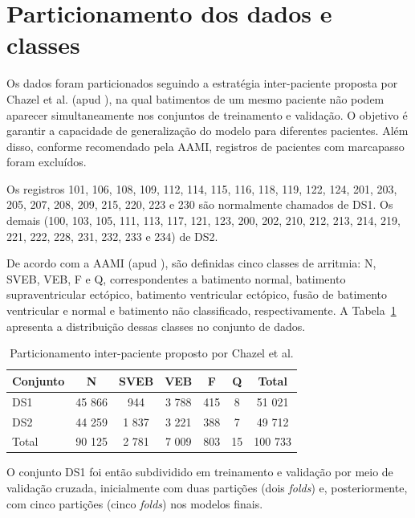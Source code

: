 \documentclass[
    12pt,                %
    openright,           %
    oneside,             %
    a4paper,             %
    brazil               %
]{abntex2}
\begin{document}
\section{Particionamento dos dados e classes}
\label{sec:particionamento}

Os dados foram particionados seguindo a estratégia inter-paciente proposta por Chazel et al. (apud ), na qual batimentos de um mesmo paciente não podem aparecer simultaneamente nos conjuntos de treinamento e validação. O objetivo é garantir a capacidade de generalização do modelo para diferentes pacientes. Além disso, conforme recomendado pela AAMI, registros de pacientes com marcapasso foram excluídos.  

Os registros 101, 106, 108, 109, 112, 114, 115, 116, 118, 119, 122, 124, 201, 203, 205, 207, 208, 209, 215, 220, 223 e 230 são normalmente chamados de DS1. Os demais (100, 103, 105, 111, 113, 117, 121, 123, 200, 202, 210, 212, 213, 214, 219, 221, 222, 228, 231, 232, 233 e 234) de DS2.

De acordo com a AAMI (apud ), são definidas cinco classes de arritmia: N, SVEB, VEB, F e Q, correspondentes a batimento normal, batimento supraventricular ectópico, batimento ventricular ectópico, fusão de batimento ventricular e normal e batimento não classificado, respectivamente. A Tabela~\ref{tab:particionamento} apresenta a distribuição dessas classes no conjunto de dados.

\begin{table}[htb]
\centering
\caption{Particionamento inter-paciente proposto por Chazel et al.}
\label{tab:particionamento}
\begin{tabular}{|l|c|c|c|c|c|c|}
\hline
Conjunto & N & SVEB & VEB & F & Q & Total \\ \hline
DS1 & 45 866 & 944 & 3 788 & 415 & 8 & 51 021 \\ \hline
DS2 & 44 259 & 1 837 & 3 221 & 388 & 7 & 49 712 \\ \hline
Total & 90 125 & 2 781 & 7 009 & 803 & 15 & 100 733 \\ \hline
\end{tabular}
\end{table}

O conjunto DS1 foi então subdividido em treinamento e validação por meio de validação cruzada, inicialmente com duas partições (dois \textit{folds}) e, posteriormente, com cinco partições (cinco \textit{folds}) nos modelos finais.  
\end{document}
